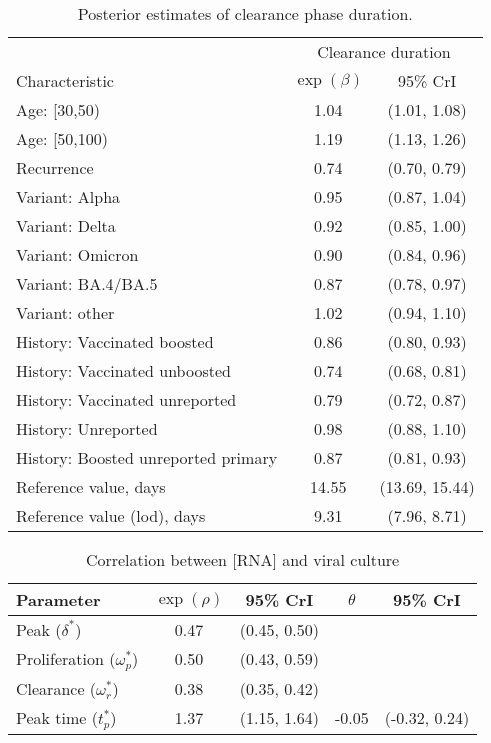 \begin{appendix}
 \begin{table}[p]
    \centering
    \caption{Posterior estimates of clearance phase duration.}
    \begin{tabular}{lcc}
     \toprule
     & \multicolumn{2}{c}{Clearance duration} \\
     Characteristic & $\exp(\beta)$ & 95\% CrI\\
     \midrule
     Age: [30,50) & 1.04 & (1.01, 1.08)\\
     Age: [50,100) & 1.19 & (1.13, 1.26)\\
     Recurrence & 0.74 & (0.70, 0.79)\\
     Variant: Alpha & 0.95 & (0.87, 1.04)\\
     Variant: Delta & 0.92 & (0.85, 1.00)\\
     Variant: Omicron & 0.90 & (0.84, 0.96)\\
     Variant: BA.4/BA.5 & 0.87 & (0.78, 0.97)\\
     Variant: other & 1.02 & (0.94, 1.10)\\
     History: Vaccinated boosted & 0.86 & (0.80, 0.93)\\
     History: Vaccinated unboosted & 0.74 & (0.68, 0.81)\\
     History: Vaccinated unreported & 0.79 & (0.72, 0.87)\\
     History: Unreported & 0.98 & (0.88, 1.10)\\
     History: Boosted unreported primary & 0.87 & (0.81, 0.93)\\
     \midrule
     Reference value, days & 14.55 & (13.69, 15.44)\\
     Reference value (lod), days & 9.31 & (7.96, 8.71)\\
     \bottomrule
     \end{tabular}
\end{table}

\begin{table}[p]
    \centering
    \caption{Correlation between [RNA] and viral culture}
    \begin{tabular}{lcccc}
     \toprule
     Parameter & $\exp(\rho)$ & 95\% CrI & $\theta$ & 95\% CrI\\
     \midrule
     Peak ($\delta^*$) & 0.47 & (0.45, 0.50) &  & \\
     Proliferation ($\omega_p^*$) & 0.50 & (0.43, 0.59) &  & \\
     Clearance ($\omega_r^*$) & 0.38 & (0.35, 0.42) &  & \\
     \midrule
     Peak time ($t_p^*$) & 1.37 & (1.15, 1.64) & -0.05 & (-0.32, 0.24)\\
     \bottomrule
     \end{tabular}
    \label{tab:corr}
\end{table}


\end{appendix}
